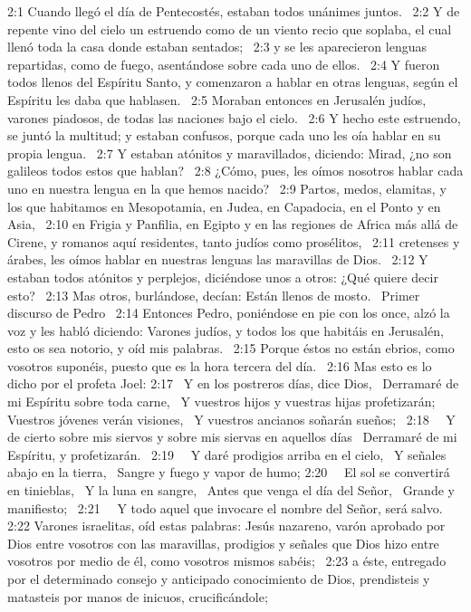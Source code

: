 2:1 Cuando llegó el día de Pentecostés, estaban todos unánimes juntos.  
2:2 Y de repente vino del cielo un estruendo como de un viento recio que soplaba, el cual llenó toda la casa donde estaban sentados;  
2:3 y se les aparecieron lenguas repartidas, como de fuego, asentándose sobre cada uno de ellos.  
2:4 Y fueron todos llenos del Espíritu Santo, y comenzaron a hablar en otras lenguas, según el Espíritu les daba que hablasen.  
2:5 Moraban entonces en Jerusalén judíos, varones piadosos, de todas las naciones bajo el cielo.  
2:6 Y hecho este estruendo, se juntó la multitud; y estaban confusos, porque cada uno les oía hablar en su propia lengua.  
2:7 Y estaban atónitos y maravillados, diciendo: Mirad, ¿no son galileos todos estos que hablan?  
2:8 ¿Cómo, pues, les oímos nosotros hablar cada uno en nuestra lengua en la que hemos nacido?  
2:9 Partos, medos, elamitas, y los que habitamos en Mesopotamia, en Judea, en Capadocia, en el Ponto y en Asia,  
2:10 en Frigia y Panfilia, en Egipto y en las regiones de Africa más allá de Cirene, y romanos aquí residentes, tanto judíos como prosélitos,  
2:11 cretenses y árabes, les oímos hablar en nuestras lenguas las maravillas de Dios.  
2:12 Y estaban todos atónitos y perplejos, diciéndose unos a otros: ¿Qué quiere decir esto?  
2:13 Mas otros, burlándose, decían: Están llenos de mosto.  
Primer discurso de Pedro  
2:14 Entonces Pedro, poniéndose en pie con los once, alzó la voz y les habló diciendo: Varones judíos, y todos los que habitáis en Jerusalén, esto os sea notorio, y oíd mis palabras.  
2:15 Porque éstos no están ebrios, como vosotros suponéis, puesto que es la hora tercera del día.  
2:16 Mas esto es lo dicho por el profeta Joel: 
2:17  Y en los postreros días, dice Dios,  
Derramaré de mi Espíritu sobre toda carne,  
Y vuestros hijos y vuestras hijas profetizarán;  
Vuestros jóvenes verán visiones,  
Y vuestros ancianos soñarán sueños;  
2:18   Y de cierto sobre mis siervos y sobre mis siervas en aquellos días  
Derramaré de mi Espíritu, y profetizarán.  
2:19   Y daré prodigios arriba en el cielo,  
Y señales abajo en la tierra,  
Sangre y fuego y vapor de humo; 
2:20   El sol se convertirá en tinieblas,  
Y la luna en sangre,  
Antes que venga el día del Señor,  
Grande y manifiesto;  
2:21   Y todo aquel que invocare el nombre del Señor, será salvo. 
2:22 Varones israelitas, oíd estas palabras: Jesús nazareno, varón aprobado por Dios entre vosotros con las maravillas, prodigios y señales que Dios hizo entre vosotros por medio de él, como vosotros mismos sabéis;  
2:23 a éste, entregado por el determinado consejo y anticipado conocimiento de Dios, prendisteis y matasteis por manos de inicuos, crucificándole; 
